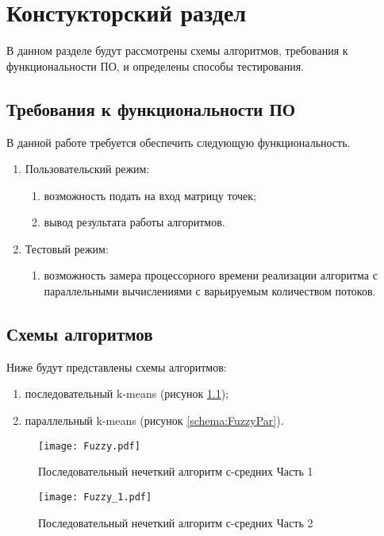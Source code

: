 \chapter{ Констукторский раздел}
\label{cha:design}
    В данном разделе будут рассмотрены схемы алгоритмов, требования к функциональности ПО, и определены способы тестирования.
    
    \section{Требования к функциональности ПО}
        В данной работе требуется обеспечить следующую функциональность.
        \begin{enumerate}
            \item Пользовательский режим:
            \begin{enumerate}
                \item возможность подать на вход матрицу точек;
                \item вывод результата работы алгоритмов.
            \end{enumerate}
	\item Тестовый режим: 
            \begin{enumerate}
            	\item возможность замера процессорного времени реализации алгоритма с параллельными вычислениями с варьируемым количеством потоков.
            \end{enumerate}
        \end{enumerate}
	
	\section{Схемы алгоритмов}
        Ниже будут представлены схемы алгоритмов: \begin{enumerate}
            \item последовательный k-means (рисунок \ref{schema:Fuzzy});
            \item параллельный k-means (рисунок \ref{schema:FuzzyPar}).
        \end{enumerate}
      
       	    \begin{figure}[h!]
       		\centering
       		\texttt{[image: Fuzzy.pdf]}
       		\caption{Последовательный нечеткий алгоритм с-средних Часть 1}
       		\label{schema:Fuzzy}
       	\end{figure}\clearpage
        \begin{figure}[h!]
            \centering
            \texttt{[image: Fuzzy\_1.pdf]}
            \caption{Последовательный нечеткий алгоритм с-средних Часть 2}
            \label{schema:Fuzzy_1}
        \end{figure}\clearpage
       	
